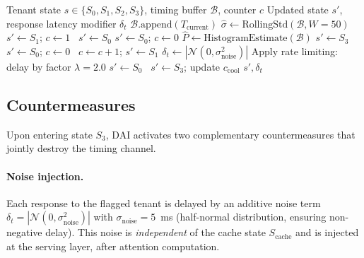 \begin{algorithm}[t]
\caption{DAI Per-Tenant State Machine}
\label{alg:dai}
\begin{algorithmic}[1]
\Require Tenant state $s \in \{S_0, S_1, S_2, S_3\}$, timing buffer $\mathcal{B}$, counter $c$
\Ensure Updated state $s'$, response latency modifier $\delta_t$
\State $\mathcal{B}.\text{append}(T_{\mathrm{current}})$ 
\State $\hat{\sigma} \gets \text{RollingStd}(\mathcal{B}, W{=}50)$
    \If{$\hat{\sigma} > \tau_\sigma$}
        $s' \gets S_1$; $c \gets 1$
    \Else~$s' \gets S_0$
    \EndIf
{}
    \If{$\hat{\sigma} \leq \tau_\sigma$}
        $s' \gets S_0$; $c \gets 0$ 
        \State $\hat{P} \gets \text{HistogramEstimate}(\mathcal{B})$
            $s' \gets S_3$ 
        \Else~$s' \gets S_0$; $c \gets 0$ 
        \EndIf
    \Else~$c \gets c + 1$; $s' \gets S_1$
    \EndIf
{}
    \State $\delta_t \gets |\mathcal{N}(0, \sigma_{\mathrm{noise}}^2)|$ 
    \State Apply rate limiting: delay by factor $\lambda = 2.0$
        $s' \gets S_0$ 
    \Else~$s' \gets S_3$; update $c_{\mathrm{cool}}$
    \EndIf
\EndIf
\State \Return $s', \delta_t$
\end{algorithmic}
\end{algorithm}

\subsection{Countermeasures}
\label{sec:dai:countermeasures}

Upon entering state $S_3$, DAI activates two complementary countermeasures that jointly
destroy the timing channel.

\paragraph{Noise injection.}
Each response to the flagged tenant is delayed by an additive noise term
$\delta_t = |\mathcal{N}(0, \sigma_{\mathrm{noise}}^2)|$ with
$\sigma_{\mathrm{noise}} = 5$~ms (half-normal distribution, ensuring non-negative delay).
This noise is \emph{independent} of the cache state $S_{\mathrm{cache}}$ and is injected
at the serving layer, after attention computation.


